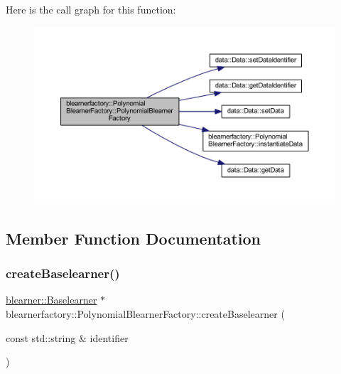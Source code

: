 Here is the call graph for this function\+:\nopagebreak
\begin{figure}[H]
\begin{center}
\leavevmode
\includegraphics[width=350pt]{classblearnerfactory_1_1_polynomial_blearner_factory_a87a3247a9abe49009e1e951f25ed97cf_cgraph}
\end{center}
\end{figure}


\subsection{Member Function Documentation}
\mbox{\label{classblearnerfactory_1_1_polynomial_blearner_factory_ac0c7f742da0a2de444e91a0cfb0a9384}} 
\subsubsection{\texorpdfstring{create\+Baselearner()}{createBaselearner()}}
{\footnotesize\ttfamily \hyperlink{classblearner_1_1_baselearner}{blearner\+::\+Baselearner} $\ast$ blearnerfactory\+::\+Polynomial\+Blearner\+Factory\+::create\+Baselearner (\begin{DoxyParamCaption}\item[{const std\+::string \&}]{identifier }\end{DoxyParamCaption})\hspace{0.3cm}{\ttfamily [virtual]}}



